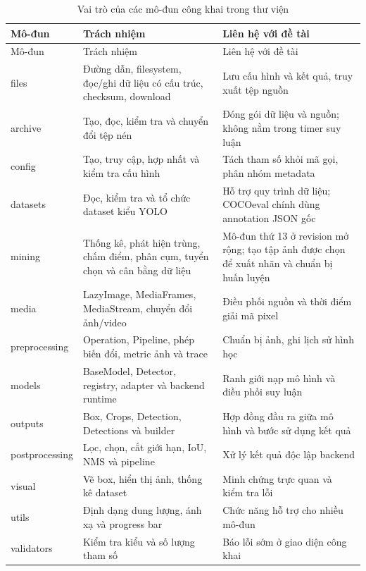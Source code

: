 \begin{longtable}{>{\raggedright\arraybackslash}p{2.8cm}>{\raggedright\arraybackslash}p{5.1cm}>{\raggedright\arraybackslash}p{6.1cm}}
\caption{Vai trò của các mô-đun công khai trong thư viện}\label{tab:modules}\\
\toprule Mô-đun & Trách nhiệm & Liên hệ với đề tài \\\midrule\endfirsthead
\toprule Mô-đun & Trách nhiệm & Liên hệ với đề tài \\\midrule\endhead
files & Đường dẫn, filesystem, đọc/ghi dữ liệu có cấu trúc, checksum, download & Lưu cấu hình và kết quả, truy xuất tệp nguồn \\
archive & Tạo, đọc, kiểm tra và chuyển đổi tệp nén & Đóng gói dữ liệu và nguồn; không nằm trong timer suy luận \\
config & Tạo, truy cập, hợp nhất và kiểm tra cấu hình & Tách tham số khỏi mã gọi, phân nhóm metadata \\
datasets & Đọc, kiểm tra và tổ chức dataset kiểu YOLO & Hỗ trợ quy trình dữ liệu; COCOeval chính dùng annotation JSON gốc \\
mining & Thống kê, phát hiện trùng, chấm điểm, phân cụm, tuyển chọn và cân bằng dữ liệu & Mô-đun thứ 13 ở revision mở rộng; tạo tập ảnh được chọn để xuất nhãn và chuẩn bị huấn luyện \\
media & LazyImage, MediaFrames, MediaStream, chuyển đổi ảnh/video & Điều phối nguồn và thời điểm giải mã pixel \\
preprocessing & Operation, Pipeline, phép biến đổi, metric ảnh và trace & Chuẩn bị ảnh, ghi lịch sử hình học \\
models & BaseModel, Detector, registry, adapter và backend runtime & Ranh giới nạp mô hình và điều phối suy luận \\
outputs & Box, Crops, Detection, Detections và builder & Hợp đồng đầu ra giữa mô hình và bước sử dụng kết quả \\
postprocessing & Lọc, chọn, cắt giới hạn, IoU, NMS và pipeline & Xử lý kết quả độc lập backend \\
visual & Vẽ box, hiển thị ảnh, thống kê dataset & Minh chứng trực quan và kiểm tra lỗi \\
utils & Định dạng dung lượng, ánh xạ và progress bar & Chức năng hỗ trợ cho nhiều mô-đun \\
validators & Kiểm tra kiểu và số lượng tham số & Báo lỗi sớm ở giao diện công khai \\
\bottomrule
\end{longtable}

